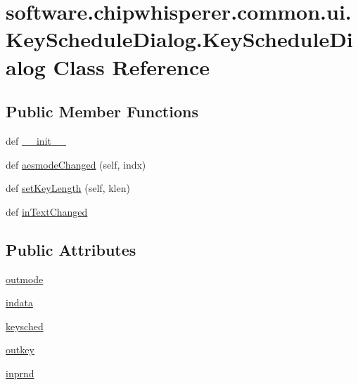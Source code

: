 \hypertarget{classsoftware_1_1chipwhisperer_1_1common_1_1ui_1_1KeyScheduleDialog_1_1KeyScheduleDialog}{}\section{software.\+chipwhisperer.\+common.\+ui.\+Key\+Schedule\+Dialog.\+Key\+Schedule\+Dialog Class Reference}
\label{classsoftware_1_1chipwhisperer_1_1common_1_1ui_1_1KeyScheduleDialog_1_1KeyScheduleDialog}
\subsection*{Public Member Functions}
\begin{DoxyCompactItemize}
\item 
def \hyperlink{classsoftware_1_1chipwhisperer_1_1common_1_1ui_1_1KeyScheduleDialog_1_1KeyScheduleDialog_afdbd67594fb1272d5e9d89e7d0e72a56}{\+\_\+\+\_\+init\+\_\+\+\_\+}
\item 
def \hyperlink{classsoftware_1_1chipwhisperer_1_1common_1_1ui_1_1KeyScheduleDialog_1_1KeyScheduleDialog_a30edbf4f2495b94713a0767377c44f4e}{aesmode\+Changed} (self, indx)
\item 
def \hyperlink{classsoftware_1_1chipwhisperer_1_1common_1_1ui_1_1KeyScheduleDialog_1_1KeyScheduleDialog_a5e76fb8372319d20427cbf8e1101a897}{set\+Key\+Length} (self, klen)
\item 
def \hyperlink{classsoftware_1_1chipwhisperer_1_1common_1_1ui_1_1KeyScheduleDialog_1_1KeyScheduleDialog_ac2575bc805f4fd64d0aeb4b4e7558e3d}{in\+Text\+Changed}
\end{DoxyCompactItemize}
\subsection*{Public Attributes}
\begin{DoxyCompactItemize}
\item 
\hyperlink{classsoftware_1_1chipwhisperer_1_1common_1_1ui_1_1KeyScheduleDialog_1_1KeyScheduleDialog_ac9f84960ed192212c88c3ce3beab65e5}{outmode}
\item 
\hyperlink{classsoftware_1_1chipwhisperer_1_1common_1_1ui_1_1KeyScheduleDialog_1_1KeyScheduleDialog_a10bbf83fdd1bad21a7c6a23979bf67f5}{indata}
\item 
\hyperlink{classsoftware_1_1chipwhisperer_1_1common_1_1ui_1_1KeyScheduleDialog_1_1KeyScheduleDialog_a247b0a323e4f2541203896afa0b25950}{keysched}
\item 
\hyperlink{classsoftware_1_1chipwhisperer_1_1common_1_1ui_1_1KeyScheduleDialog_1_1KeyScheduleDialog_a42b500f9ca375483f89049cdece0c11d}{outkey}
\item 
\hyperlink{classsoftware_1_1chipwhisperer_1_1common_1_1ui_1_1KeyScheduleDialog_1_1KeyScheduleDialog_aa8e996aa6caacc753da7a394a1aa9800}{inprnd}
\end{DoxyCompactItemize}



